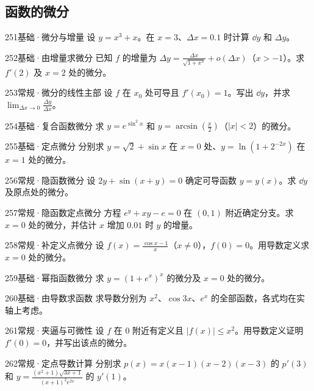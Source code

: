 \subsection{函数的微分}
\begin{exercise}{251}{基础·微分与增量}
设 $y=x^3+x$。在 $x=3$、$\Delta x=0.1$ 时计算 $\dd y$ 和 $\Delta y$。
\end{exercise}
\begin{exercise}{252}{基础·由增量求微分}
已知 $f$ 的增量为 $\Delta y=\frac{\Delta x}{\sqrt{1+x^3}}+o(\Delta x)$（$x>-1$）。求 $f'(2)$ 及 $x=2$ 处的微分。
\end{exercise}
\begin{exercise}{253}{常规·微分的线性主部}
设 $f$ 在 $x_0$ 处可导且 $f'(x_0)=1$。写出 $\dd y$，并求 $\lim_{\Delta x\to0}\frac{\Delta y}{\Delta x}$。
\end{exercise}
\begin{exercise}{254}{基础·复合函数微分}
求 $y=e^{\sin^2x}$ 和 $y=\arcsin(\frac{x}{2})$（$|x|<2$）的微分。
\end{exercise}
\begin{exercise}{255}{基础·定点微分}
分别求 $y=\sqrt2+\sin x$ 在 $x=0$ 处、$y=\ln(1+2^{-2x})$ 在 $x=1$ 处的微分。
\end{exercise}
\begin{exercise}{256}{常规·隐函数微分}
设 $2y+\sin(x+y)=0$ 确定可导函数 $y=y(x)$。求 $\dd y$ 及原点处的微分。
\end{exercise}
\begin{exercise}{257}{常规·隐函数定点微分}
方程 $e^y+xy-e=0$ 在 $(0,1)$ 附近确定分支。求 $x=0$ 处的微分，并估计 $x$ 增加 $0.01$ 时 $y$ 的增量。
\end{exercise}
\begin{exercise}{258}{常规·补定义点微分}
设 $f(x)=\frac{\cos x-1}{x}$（$x\ne0$），$f(0)=0$。用导数定义求 $x=0$ 处的微分。
\end{exercise}
\begin{exercise}{259}{基础·幂指函数微分}
求 $y=(1+e^x)^x$ 的微分及 $x=0$ 处的微分。
\end{exercise}
\begin{exercise}{260}{基础·由导数求函数}
求导数分别为 $x^2$、$\cos3x$、$e^x$ 的全部函数，各式均在实轴上考虑。
\end{exercise}
\begin{exercise}{261}{常规·夹逼与可微性}
设 $f$ 在 $0$ 附近有定义且 $|f(x)|\le x^2$。用导数定义证明 $f'(0)=0$，并写出该点的微分。
\end{exercise}
\begin{exercise}{262}{常规·定点导数计算}
分别求 $p(x)=x(x-1)(x-2)(x-3)$ 的 $p'(3)$ 和 $y=\frac{(x^2+1)\sqrt{3x+1}}{(x+1)^2e^{2x}}$ 的 $y'(1)$。
\end{exercise}
